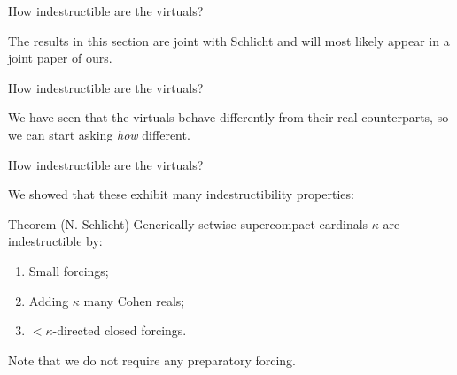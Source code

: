 \documentclass{beamer}
\begin{document}
\begin{frame}{How indestructible are the virtuals?}

  The results in this section are joint with \alert{Schlicht} and will most likely appear in a joint paper of ours.

\end{frame}

\begin{frame}{How indestructible are the virtuals?}

  We have seen that the virtuals behave differently from their real counterparts, so we can start asking \textit{how} different. 



\end{frame}

\begin{frame}{How indestructible are the virtuals?}

  We showed that these exhibit many indestructibility properties:

  \begin{block}{Theorem (N.-Schlicht)}
    Generically setwise supercompact cardinals $\kappa$ are indestructible by:
    \begin{enumerate}
      \item Small forcings;
      \item Adding $\kappa$ many Cohen reals;
      \item ${<}\kappa$-directed closed forcings.
    \end{enumerate}
  \end{block}

  Note that we do \alert{not} require any preparatory forcing.

\end{frame}
\end{document}
